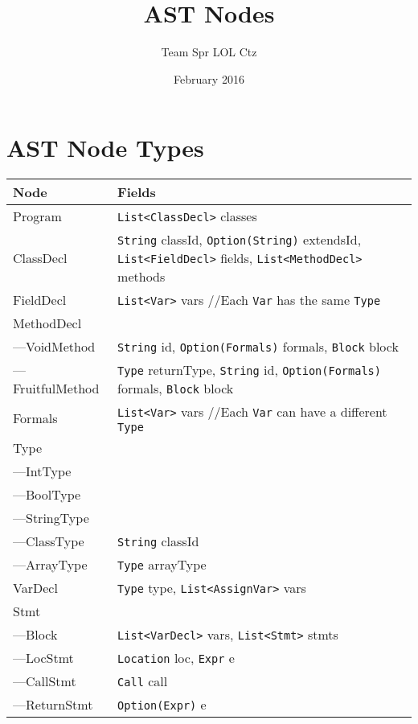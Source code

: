 \documentclass{article}
\title{AST Nodes}
\author{Team Spr LOL Ctz}
\date{February 2016}
\newcommand\tab[1][1cm]{\hspace*{#1}}
\begin{document}
\maketitle

\section{AST Node Types}

\begin{longtable}{p{} | p{}}
    \textbf{Node} & \textbf{Fields} \\\hline
    Program & \texttt{List<ClassDecl>} classes \\\hline
    ClassDecl & \texttt{String} classId, \texttt{Option(String)} extendsId, \texttt{List<FieldDecl>} fields, \texttt{List<MethodDecl>} methods \\\hline
    FieldDecl & \texttt{List<Var>} vars \tab\tab //Each \texttt{Var} has the same \texttt{Type} \\\hline
    MethodDecl & \\\hline
    ---VoidMethod & \texttt{String} id, \texttt{Option(Formals)} formals, \texttt{Block} block \\\hline
    ---FruitfulMethod & \texttt{Type} returnType, \texttt{String} id, \texttt{Option(Formals)} formals, \texttt{Block} block \\\hline
    Formals & \texttt{List<Var>} vars \tab\tab //Each \texttt{Var} can have a different \texttt{Type} \\\hline
    Type & \\\hline
    ---IntType & \\\hline
    ---BoolType & \\\hline
    ---StringType & \\\hline
    ---ClassType & \texttt{String} classId \\\hline
    ---ArrayType & \texttt{Type} arrayType \\\hline
    VarDecl & \texttt{Type} type, \texttt{List<AssignVar>} vars \\\hline
    Stmt & \\\hline
    ---Block & \texttt{List<VarDecl>} vars, \texttt{List<Stmt>} stmts \\\hline
    ---LocStmt & \texttt{Location} loc, \texttt{Expr} e \\\hline
    ---CallStmt & \texttt{Call} call \\\hline
    ---ReturnStmt & \texttt{Option(Expr)} e \\\hline

\end{longtable}
\end{document}
